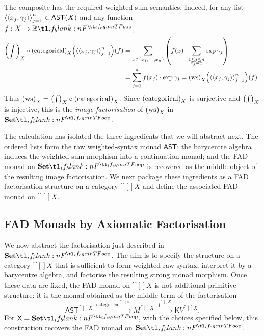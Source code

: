 \documentclass[11pt,a4paper]{article}
\theoremstyle{definition}
\theoremstyle{remark}
\providecommand{\AST}{\mathsf{AST}}
\providecommand{\categ}{\operatorname{categorical}}
\providecommand{\iwrt}{\int}
\providecommand{\ws}{\operatorname{ws}}
\providecommand{\cont}{\mathsf{K}}
\begin{document}
The composite has the required weighted-sum semantics. Indeed, for any list
\( \tuple{\tuple{x_{j}, \gamma_{j}}}_{j = 1}^{n}
\in \Fun[nn]{ \AST }{ X } \) and any function \( f:X\to\R \),
\begin{equation*}
	\begin{aligned}
		\fn[p]{ \fn[p]{ \Nat[nn]{ \iwrt }{ X } \circ \Nat[nn]{ \categ }{ X } }{ \tuple{\tuple{x_{j}, \gamma_{j}}}_{j = 1}^{n} } }{ f }
		&=
		\sum_{x \in \left\{ x_{1}, \cdots, x_{n} \right\} }
		\left(
		\fn[n]{ f }{ x } \cdot
		\sum_{\substack{1 \le j \le n \\ x_{j} = x}} \exp \gamma_{j}
		\right)
		\\
		&=
		\sum_{j = 1}^{n} \fn[n]{ f }{ x_{j} } \cdot \exp \gamma_{j}=
		\fn[p]{ \fn[n]{ \Nat[nn]{ \ws }{ X } }{ \tuple{\tuple{x_{j}, \gamma_{j}}}_{j = 1}^{n} } }{ f }.
	\end{aligned}
\end{equation*}
Thus \( \Nat[nn]{ \ws }{ X } = \Nat[nn]{ \iwrt }{ X } \circ
\Nat[nn]{ \categ }{ X } \). Since \( \Nat[nn]{ \categ }{ X } \) is
surjective and \( \Nat[nn]{ \iwrt }{ X } \) is injective, this is the
\emph{image factorisation} of \( \Nat[nn]{ \ws }{ X } \) in \( \Set \).

The calculation has isolated the three ingredients that we will abstract
next. The ordered lists form the raw weighted-syntax monad \( \AST \); the
barycentre algebra induces the weighted-sum morphism into a continuation
monad; and the FAD monad on \( \Set \) is recovered as the middle object of
the resulting image factorisation. We next package these
ingredients as a FAD factorisation structure on a category \( \cat[]{X} \) and
define the associated FAD monad on \( \cat[]{X} \).


\subsection{FAD Monads by Axiomatic Factorisation}
\label{sec:generalising-the-set-procedure}

We now abstract the factorisation just described in \( \Set \). The aim is to
specify the structure on a category \( \cat[]{X} \) that is sufficient to form
weighted raw syntax, interpret it by a barycentre algebra, and factorise the
resulting strong monad morphism. Once these data are fixed, the FAD monad on
\( \cat[]{X} \) is not additional primitive structure: it is the monad obtained
as the middle term of the factorisation
\[
\AST^{\cat[]{X}}
\xrightarrow{\;\categ^{\cat[]{X}}\;}
M^{\cat[]{X}}
\xrightarrow{\;\iwrt^{\cat[]{X}}\;}
\cont{V}^{\cat[]{X}} .
\]
For \( \cat[]{X}=\Set \), with the choices specified below, this construction
recovers the FAD monad on \( \Set \).
\end{document}
